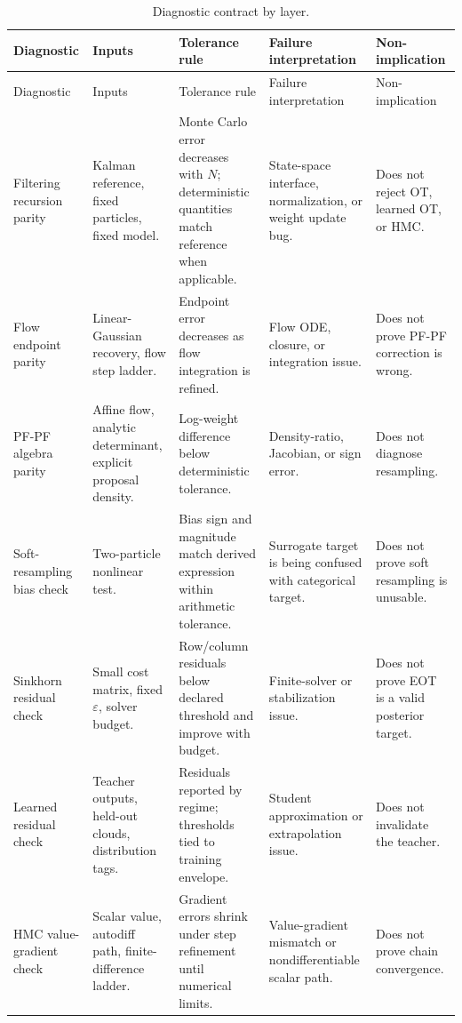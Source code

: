 \begin{longtable}{@{}p{} p{} p{} p{} p{}@{}}
\caption{Diagnostic contract by layer.}
\label{tab:bf-dpf-debug-diagnostic-contract}\\
\toprule
Diagnostic & Inputs & Tolerance rule & Failure interpretation & Non-implication \\
\midrule
\endfirsthead
\toprule
Diagnostic & Inputs & Tolerance rule & Failure interpretation & Non-implication \\
\midrule
\endhead
Filtering recursion parity &
Kalman reference, fixed particles, fixed model. &
Monte Carlo error decreases with $N$; deterministic quantities match reference
when applicable. &
State-space interface, normalization, or weight update bug. &
Does not reject OT, learned OT, or HMC. \\
Flow endpoint parity &
Linear-Gaussian recovery, flow step ladder. &
Endpoint error decreases as flow integration is refined. &
Flow ODE, closure, or integration issue. &
Does not prove PF-PF correction is wrong. \\
PF-PF algebra parity &
Affine flow, analytic determinant, explicit proposal density. &
Log-weight difference below deterministic tolerance. &
Density-ratio, Jacobian, or sign error. &
Does not diagnose resampling. \\
Soft-resampling bias check &
Two-particle nonlinear test. &
Bias sign and magnitude match derived expression within arithmetic tolerance. &
Surrogate target is being confused with categorical target. &
Does not prove soft resampling is unusable. \\
Sinkhorn residual check &
Small cost matrix, fixed $\varepsilon$, solver budget. &
Row/column residuals below declared threshold and improve with budget. &
Finite-solver or stabilization issue. &
Does not prove EOT is a valid posterior target. \\
Learned residual check &
Teacher outputs, held-out clouds, distribution tags. &
Residuals reported by regime; thresholds tied to training envelope. &
Student approximation or extrapolation issue. &
Does not invalidate the teacher. \\
HMC value-gradient check &
Scalar value, autodiff path, finite-difference ladder. &
Gradient errors shrink under step refinement until numerical limits. &
Value-gradient mismatch or nondifferentiable scalar path. &
Does not prove chain convergence. \\
\bottomrule
\end{longtable}

